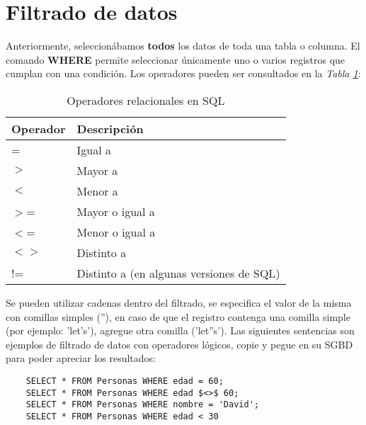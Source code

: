 \section{Filtrado de datos}

Anteriormente, seleccionábamos \textbf{todos} los datos de toda una tabla o columna. El comando \textbf{WHERE} permite seleccionar únicamente uno o varios registros que cumplan con una condición. Los operadores pueden ser consultados en la \textit{Tabla \ref{tab: 9}}:
\begin{table}[H]
    \centering
    \caption{Operadores relacionales en SQL}
    \label{tab: 9}
    \begin{tabular}{l l}
        \hline
        \textbf{Operador} & \textbf{Descripción} \\
        \hline
        =           & Igual a \\
        $>$         & Mayor a \\
        $<$         & Menor a \\
        $>$=        & Mayor o igual a \\
        $<$=        & Menor o igual a \\
        $<>$        & Distinto a \\
        !=          & Distinto a  (en algunas versiones de SQL) \\
        \hline
    \end{tabular}
\end{table}

Se pueden utilizar cadenas dentro del filtrado, se especifica el valor de la misma con comillas simples (''), en caso de que el registro contenga una comilla simple (por ejemplo: 'let's'), agregue otra comilla ('let''s'). Las siguientes sentencias son ejemplos de filtrado de datos con operadores lógicos, copie y pegue en su SGBD para poder apreciar los resultados:
\begin{lstlisting}
    SELECT * FROM Personas WHERE edad = 60;
    SELECT * FROM Personas WHERE edad $<>$ 60;
    SELECT * FROM Personas WHERE nombre = 'David';
    SELECT * FROM Personas WHERE edad < 30
\end{lstlisting}


